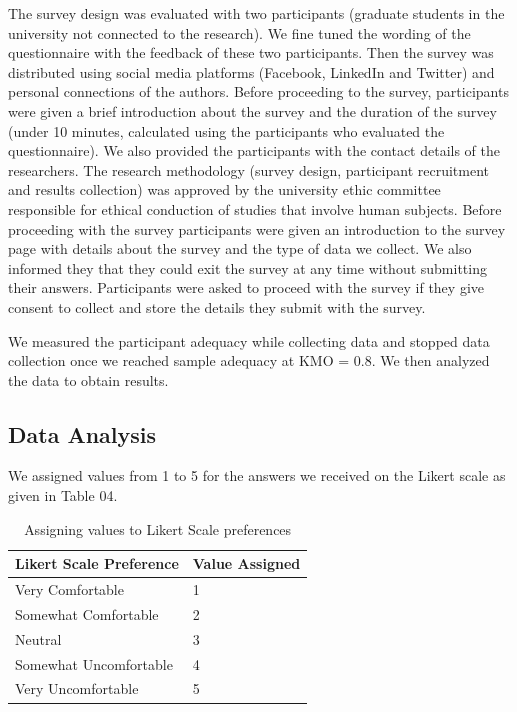 \documentclass[conference]{IEEEtran}
\begin{document}
The survey design was evaluated with two participants (graduate students in the university not connected to the research). We fine tuned the wording of the questionnaire with the feedback of these two participants. Then the survey was distributed using social media platforms (Facebook, LinkedIn and Twitter) and personal connections of the authors. Before proceeding to the survey, participants were given a brief introduction about the survey and the duration of the survey (under 10 minutes, calculated using the participants who evaluated the questionnaire). We also provided the participants with the contact details of the researchers. The research methodology (survey design, participant recruitment and results collection) was approved by the university ethic committee responsible for ethical conduction of studies that involve human subjects. Before proceeding with the survey participants were given an introduction to the survey page with details about the survey and the type of data we collect. We also informed they that they could exit the survey at any time without submitting their answers. Participants were asked to proceed with the survey if they give consent to collect and store the details they submit with the survey.

We measured the participant adequacy while collecting data and stopped data collection once we reached sample adequacy at KMO = 0.8. We then analyzed the data to obtain results.

\subsection {Data Analysis}

We assigned values from 1 to 5 for the answers we received on the Likert scale as given in Table 04.

\begin{center}
\begin{table}[htbp]
\caption{Assigning values to Likert Scale preferences}
\begin{center}
\begin{tabular}{|l|l|} 
\hline
Likert Scale Preference & Value Assigned \\
\hline
Very Comfortable & 1\\
\hline
Somewhat Comfortable& 2 \\
\hline
Neutral & 3  \\
\hline
Somewhat Uncomfortable & 4 \\
\hline
Very Uncomfortable & 5 \\
\hline
\end{tabular}
\end{center}
\end{table}
\end{center}
\end{document}

